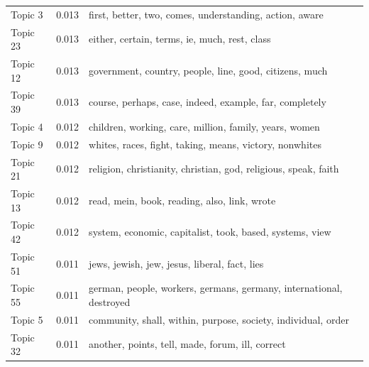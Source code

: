 \documentclass[12pt]{paper}
\begin{document}
\begin{table}[H]
\begin{adjustbox}{width=1\textwidth}
\begin{tabular}{lll}
			Topic 3                            & 0.013                                                  & first, better, two, comes, understanding, action, aware             \\
			Topic 23                           & 0.013                                                  & either, certain, terms, ie, much, rest, class                       \\
			Topic 12                           & 0.013                                                  & government, country, people, line, good, citizens, much             \\
			Topic 39                           & 0.013                                                  & course, perhaps, case, indeed, example, far, completely             \\
			Topic 4                            & 0.012                                                  & children, working, care, million, family, years, women              \\
			Topic 9                            & 0.012                                                  & whites, races, fight, taking, means, victory, nonwhites             \\
			Topic 21                           & 0.012                                                  & religion, christianity, christian, god, religious, speak, faith     \\
			Topic 13                           & 0.012                                                  & read, mein, book, reading, also, link, wrote                        \\
			Topic 42                           & 0.012                                                  & system, economic, capitalist, took, based, systems, view            \\
			Topic 51                           & 0.011                                                  & jews, jewish, jew, jesus, liberal, fact, lies                       \\
			Topic 55                           & 0.011                                                  & german, people, workers, germans, germany, international, destroyed \\
			Topic 5                            & 0.011                                                  & community, shall, within, purpose, society, individual, order       \\
			Topic 32                           & 0.011                                                  & another, points, tell, made, forum, ill, correct                    \\

\end{tabular}
\end{adjustbox}
\end{table}
\end{document}
